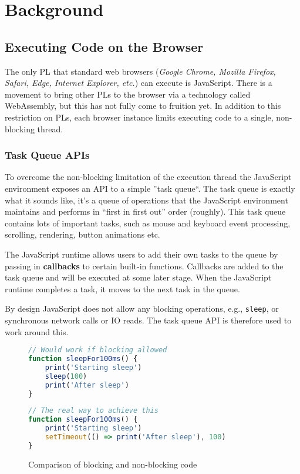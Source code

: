 \chapter{Background}

\section{Executing Code on the Browser}

The only PL that standard web browsers (\emph{Google Chrome, Mozilla Firefox, Safari, Edge, Internet Explorer, etc.}) can execute is JavaScript. There is a movement to bring other PLs to the browser via a technology called WebAssembly, but this has not fully come to fruition yet.  
In addition to this restriction on PLs, each browser instance limits executing code to a single, non-blocking thread.

\subsection{Task Queue APIs}\label{background:task-queues}
To overcome the non-blocking limitation of the execution thread the JavaScript environment exposes an API to a simple ''task queue``.
The task queue is exactly what it sounds like, it's a queue of operations that the JavaScript environment maintains and performs in ``first in first out'' order (roughly). This task queue contains lots of important tasks, such as mouse and keyboard event processing, scrolling, rendering, button animations etc.

The JavaScript runtime allows users to add their own tasks to the queue by passing in \textbf{callbacks} to certain built-in functions. Callbacks are added to the task queue and will be executed at some later stage.
When the JavaScript runtime completes a task, it moves to the next task in the queue.

By design JavaScript does not allow any blocking operations, e.g., \verb|sleep|, or synchronous network calls or IO reads. The task queue API is therefore used to work around this.

\begin{figure}
    \caption{Comparison of blocking and non-blocking code}
    \label{background:blockingcomparison}
    \begin{minipage}[t]{0.45\textwidth}
        \begin{lstlisting}[language=javascript]
// Would work if blocking allowed
function sleepFor100ms() {
    print('Starting sleep')
    sleep(100)
    print('After sleep')
}
        \end{lstlisting}
    \end{minipage}
    \begin{minipage}[t]{0.45\textwidth}
        \begin{lstlisting}[language=javascript]
// The real way to achieve this
function sleepFor100ms() {
    print('Starting sleep')
    setTimeout(() => print('After sleep'), 100)
}
        \end{lstlisting}
    \end{minipage}
\end{figure}

